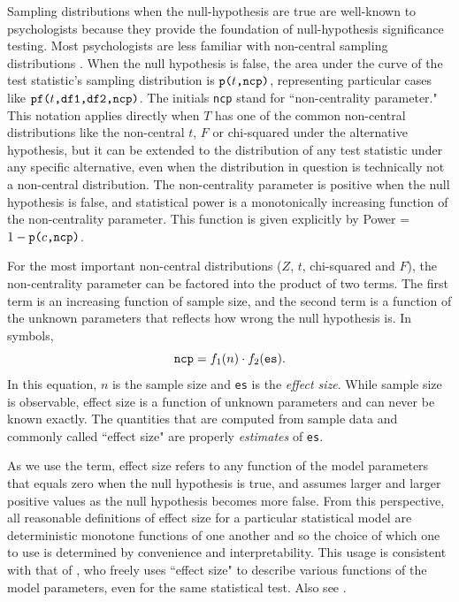\documentclass[jou]{apa6} %
\newcommand{\R}[1]{\mbox{\texttt{#1}}} %
\begin{document}
Sampling distributions when the null-hypothesis are true are well-known to psychologists because they provide the foundation of null-hypothesis significance testing.  Most psychologists are less familiar with non-central sampling distributions \parencite[see][for a detailed and authoritative treatment]{JohnsonEtAl1995}. 
When the null hypothesis is false, the area under the curve of the test statistic's sampling distribution is $\R{p(}t\R{,ncp)}$, representing particular cases like $\R{pf(}t\R{,df1,df2,ncp)}$. The initials \texttt{ncp} stand for ``non-centrality parameter." This notation applies directly when $T$ has one of the common non-central distributions like the non-central $t$, $F$ or chi-squared under the alternative hypothesis, but it can be extended to the distribution of any test statistic under any specific alternative, even when the distribution in question is technically not a non-central distribution.  The non-centrality parameter is positive when the null hypothesis is false, and statistical power is a monotonically increasing function of the non-centrality parameter. This function is given explicitly by Power = $1-\R{p(}c\R{,ncp)}$. 

For the most important non-central distributions ($Z$, $t$, chi-squared and $F$), the non-centrality parameter can be factored into the product of two terms.  The first term is an increasing function of sample size, and the second term is a function of the unknown parameters that reflects how wrong the null hypothesis is. In symbols,
\begin{equation}\label{ncpmult}
    \R{ncp} = f_1(n) \cdot f_2(\R{es}).
\end{equation}
In this equation, $n$ is the sample size and \texttt{es} is the \emph{effect size}. While sample size is observable, effect size is a function of unknown parameters and can never be known exactly. The quantities that are computed from sample data and commonly called ``effect size" are properly \emph{estimates} of \texttt{es}.

As we use the term, effect size refers to any function of the model parameters that equals zero when the null hypothesis is true, and assumes larger and larger positive values as the null hypothesis becomes more false. From this perspective, all reasonable definitions of effect size for a particular statistical model are deterministic monotone functions of one another and so the choice of which one to use is determined by convenience and interpretability. This usage is consistent with that of \textcite{Cohen1988}, who freely uses ``effect size" to describe various functions of the model parameters, even for the same statistical test. Also see \textcite{GrissomKim2012}. 
\end{document}
